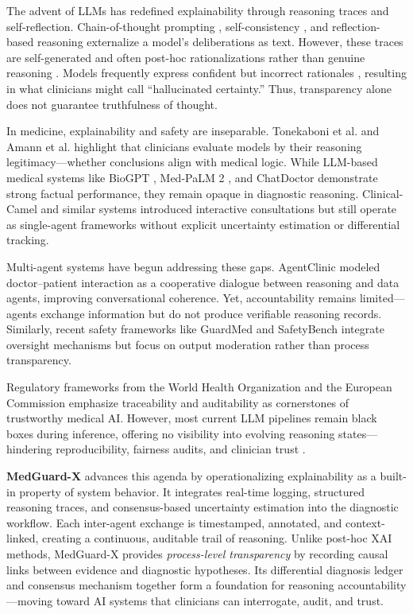 \documentclass[letterpaper]{article} %
\begin{document}
The advent of LLMs has redefined explainability through reasoning traces and self-reflection. Chain-of-thought prompting \cite{wei2022chain}, self-consistency \cite{wang2022self}, and reflection-based reasoning \cite{shinn2023reflexion} externalize a model’s deliberations as text. However, these traces are self-generated and often post-hoc rationalizations rather than genuine reasoning \cite{turpin2023language}. Models frequently express confident but incorrect rationales \cite{kadavath2022language,ji2023survey}, resulting in what clinicians might call “hallucinated certainty.” Thus, transparency alone does not guarantee truthfulness of thought.

In medicine, explainability and safety are inseparable. Tonekaboni et al. \cite{tonekaboni2019clinicians} and Amann et al. \cite{amann2020explainability} highlight that clinicians evaluate models by their reasoning legitimacy—whether conclusions align with medical logic. While LLM-based medical systems like BioGPT \cite{luo2022biogpt}, Med-PaLM 2 \cite{singhal2025toward}, and ChatDoctor \cite{li2023chatdoctor} demonstrate strong factual performance, they remain opaque in diagnostic reasoning. Clinical-Camel \cite{toma2023clinical} and similar systems introduced interactive consultations but still operate as single-agent frameworks without explicit uncertainty estimation or differential tracking.

Multi-agent systems have begun addressing these gaps. AgentClinic \cite{schmidgall2024agentclinic} modeled doctor–patient interaction as a cooperative dialogue between reasoning and data agents, improving conversational coherence. Yet, accountability remains limited—agents exchange information but do not produce verifiable reasoning records. Similarly, recent safety frameworks like GuardMed and SafetyBench integrate oversight mechanisms but focus on output moderation rather than process transparency.

Regulatory frameworks from the World Health Organization \cite{guidance2021ethics} and the European Commission \cite{bomhard2021regulation} emphasize traceability and auditability as cornerstones of trustworthy medical AI. However, most current LLM pipelines remain black boxes during inference, offering no visibility into evolving reasoning states—hindering reproducibility, fairness audits, and clinician trust \cite{begoli2019need,doshi2017towards}.

\textbf{MedGuard-X} advances this agenda by operationalizing explainability as a built-in property of system behavior. It integrates real-time logging, structured reasoning traces, and consensus-based uncertainty estimation into the diagnostic workflow. Each inter-agent exchange is timestamped, annotated, and context-linked, creating a continuous, auditable trail of reasoning. Unlike post-hoc XAI methods, MedGuard-X provides \emph{process-level transparency} by recording causal links between evidence and diagnostic hypotheses. Its differential diagnosis ledger and consensus mechanism together form a foundation for reasoning accountability—moving toward AI systems that clinicians can interrogate, audit, and trust.
\end{document}
